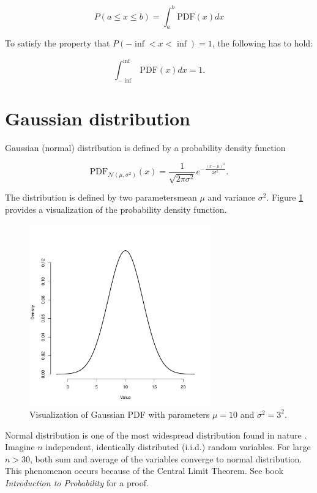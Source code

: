 \documentclass[thesis=B,english]{FITthesis}[2012/06/26]
\begin{document}
\begin{equation} \label{eq:pdf_interval}
P(a \leq x \leq b) = \int_a^b \text{PDF}(x) dx
\end{equation}

To satisfy the property that $P(-\inf < x < \inf) = 1$, the following has to hold:

\begin{equation}
\int_{-\inf}^{\inf} \text{PDF}(x) dx = 1.
\end{equation}

\section{Gaussian distribution}

Gaussian (normal) distribution is defined by a probability density function

\begin{equation} \label{eq:gaussian_pdf}
\text{PDF}_{\mathcal{N}(\mu,\sigma^2)}(x) = \frac{1}{\sqrt{2 \pi \sigma^2}}e^{-\frac{(x-\mu)^2}{2 \sigma^2}}.
\end{equation}

The distribution is defined by two parameters\textemdash mean $\mu$ and variance $\sigma^2$. Figure \ref{fig:gaussian} provides a visualization of the probability density function.

\begin{figure}
	\centering
 	\includegraphics[width=0.7\textwidth]{gaussian}
 	\caption{Visualization of Gaussian PDF with parameters $\mu=10$ and $\sigma^2=3^2$.}
 	\label{fig:gaussian}
\end{figure}

Normal distribution is one of the most widespread distribution found in nature \cite{gaussian-distribution-widespread}. Imagine $n$ independent, identically distributed (i.i.d.) random variables. For large $n > 30$, both sum and average of the variables converge to normal distribution. This phenomenon occurs because of the Central Limit Theorem. See book \textit{Introduction to Probability} \cite{clt-proof} for a proof.
\end{document}
